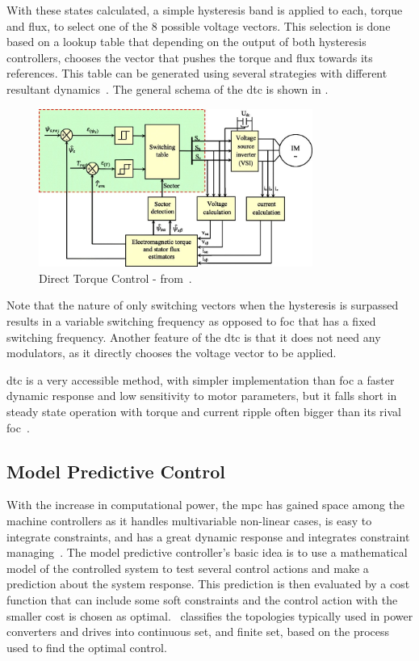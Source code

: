 With these states calculated, a simple hysteresis band is applied to each, torque and flux, to select one of the 8 possible voltage vectors. This selection is done based on a lookup table that depending on the output of both hysteresis controllers, chooses the vector that pushes the torque and flux towards its references. This table can be generated using several strategies with different resultant dynamics~\cite{Buja:DTC_lookup_strategies:1997,Nasr:DTC_PMSM_improvement:2022}. The general schema of the \gls{dtc} is shown in .
\begin{figure}[!htb]
	\centering
	\includegraphics[width=0.8\textwidth]{Figures/dtc_schema.jpg}
	\caption[Direct Torque Control - from~\citet{Quanjli:DTC_schema:2019}.]{Direct Torque Control - from~\citet{Quanjli:DTC_schema:2019}.}
	\label{fig:example_DTC} %
\end{figure}
Note that the nature of only switching vectors when the hysteresis is surpassed results in a variable switching frequency as opposed to \gls{foc} that has a fixed switching frequency. Another feature of the \gls{dtc} is that it does not need any modulators, as it directly chooses the voltage vector to be applied.

\gls{dtc} is a very accessible method, with simpler implementation than \gls{foc} a faster dynamic response and low sensitivity to motor parameters, but it falls short in steady state operation with torque and current ripple often bigger than its rival \gls{foc}~\cite{Zhong:DTC_pmsm_dynamics:1997,Niu:DTC_vs_other_DTC_vs_FOC:2016}.



\subsection{Model Predictive Control}
With the increase in computational power, the \gls{mpc} has gained space among the machine controllers as it handles multivariable non-linear cases, is easy to integrate constraints, and has a great dynamic response and integrates constraint managing~\cite{Vazquez:MPC_uses:2014}. The model predictive controller's basic idea is to use a mathematical model of the controlled system to test several control actions and make a prediction about the system response. This prediction is then evaluated by a cost function that can include some soft constraints and the control action with the smaller cost is chosen as optimal.~\citet{Vazquez:MPC_in_power_systems_review:2017:IEEE} classifies the topologies typically used in power converters and drives into continuous set, and finite set, based on the process used to find the optimal control. 


